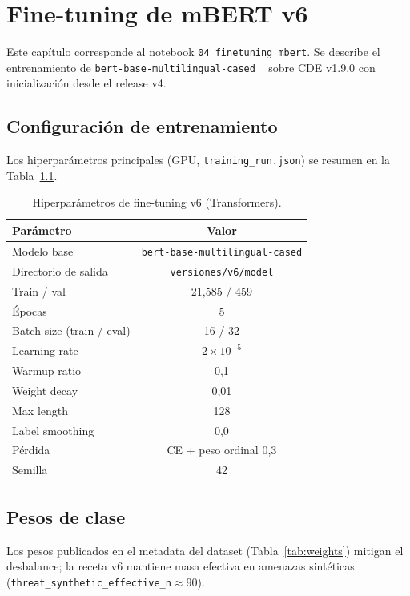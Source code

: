\chapter{Fine-tuning de mBERT v6}
\label{ch:mbert}

Este capítulo corresponde al notebook \texttt{04\_finetuning\_mbert}. Se
describe el entrenamiento de \texttt{bert-base-multilingual-cased}
~\cite{devlin2019bert} sobre CDE v1.9.0 con inicialización desde el release v4.

\section{Configuración de entrenamiento}

Los hiperparámetros principales (GPU, \texttt{training\_run.json}) se resumen en
la Tabla~\ref{tab:hparams}.

\begin{table}[H]
\centering
\caption{Hiperparámetros de fine-tuning v6 (Transformers).}
\label{tab:hparams}
\begin{tabular}{lc}
\toprule
Parámetro & Valor \\
\midrule
Modelo base & \texttt{bert-base-multilingual-cased} \\
Directorio de salida & \texttt{versiones/v6/model} \\
Train / val & 21{,}585 / 459 \\
Épocas & 5 \\
Batch size (train / eval) & 16 / 32 \\
Learning rate & $2 \times 10^{-5}$ \\
Warmup ratio & 0{,}1 \\
Weight decay & 0{,}01 \\
Max length & 128 \\
Label smoothing & 0{,}0 \\
Pérdida & CE + peso ordinal 0{,}3 \\
Semilla & 42 \\
\bottomrule
\end{tabular}
\end{table}

\section{Pesos de clase}

Los pesos publicados en el metadata del dataset (Tabla~\ref{tab:weights}) mitigan
el desbalance; la receta v6 mantiene masa efectiva en amenazas sintéticas
(\texttt{threat\_synthetic\_effective\_n}$\approx 90$).

